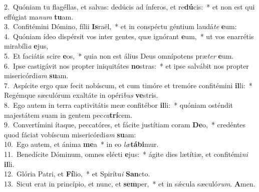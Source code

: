 {2.~}Quóniam tu flagéllas, et salvas: dedúcis ad ínferos, et re\textbf{dú}cis:~* et non est qui effúgiat ma\textit{num} \textbf{tu}am.\\
{3.~}Confitémini Dómino, fílii \textbf{Is}raël,~* et in conspéctu géntium laudá\textit{te} \textbf{e}um:\\
{4.~}Quóniam ídeo dispérsit vos inter gentes, quæ ignórant \textbf{e}um,~* ut vos enarrétis mirabíli\textit{a} \textbf{e}jus,\\
{5.~}Et faciátis scire \textbf{e}os,~* quia non est álius Deus omnípotens præ\textit{ter} \textbf{e}um.\\
{6.~}Ipse castigávit nos propter iniquitátes \textbf{no}stras:~* et ipse salvábit nos propter misericórdi\textit{am} \textbf{su}am.\\
{7.~}Aspícite ergo quæ fecit nobíscum, et cum timóre et tremóre confitémini \textbf{il}li:~* Regémque sæculórum exaltáte in opéri\textit{bus} \textbf{ve}stris.\\
{8.~}Ego autem in terra captivitátis meæ confitébor \textbf{il}li:~* quóniam osténdit majestátem suam in gentem pec\textit{ca}\textbf{trí}cem.\\
{9.~}Convertímini ítaque, peccatóres, et fácite justítiam coram \textbf{De}o,~* credéntes quod fáciat vobíscum misericórdi\textit{am} \textbf{su}am:\\
{10.~}Ego autem, et ánima \textbf{me}a~* in eo \textit{læ}\textbf{tá}\textbf{bi}mur.\\
{11.~}Benedícite Dóminum, omnes elécti \textbf{e}jus:~* ágite dies lætítiæ, et confitémi\textit{ni} \textbf{il}li.\\
{12.~}Glória Patri, et \textbf{Fí}lio,~* et Spirítu\textit{i} \textbf{San}cto.\\
{13.~}Sicut erat in princípio, et nunc, et \textbf{sem}per,~* et in sǽcula sæculó\textit{rum}. \textbf{A}men.\\
